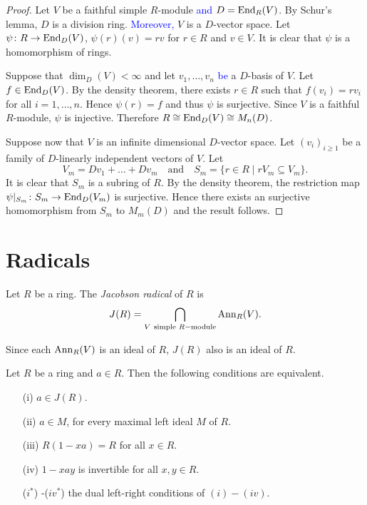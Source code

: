 \begin{proof}
Let $V$ be a faithful simple $R$-module \textcolor{blue}{and}
$D=\operatorname{End}_R(V)$. By Schur's lemma, $D$ is a division ring. 
\textcolor{blue}{Moreover,} 
$V$ is a $D$-vector space.
Let $\psi\colon R\rightarrow\operatorname{End}_D(V)$, $\psi
(r)(v)=rv$ for $r\in R$ and $v\in V$. It is clear that $\psi$ is a homomorphism of rings.

Suppose that $\dim_D(V)<\infty$ and let $v_1,\dots,v_n$ \textcolor{blue}{be} 
a $D$-basis of $V$. Let $f\in \operatorname{End}_D(V)$. By the density theorem, 
there exists $r\in R$ such that $f(v_i)=rv_i$ for all
$i=1,\dots,n$. Hence $\psi (r)=f$ and thus $\psi$ is surjective. Since
$V$ is a faithful $R$-module, $\psi$ is injective. Therefore $R\cong \operatorname{End}_D(V)\cong M_n(D)$. 

Suppose now that $V$ is an infinite dimensional $D$-vector space. Let $(
v_i) _{i\geq 1}$ be a family of $D$-linearly independent vectors of $V$. Let
$$V_m=Dv_1+\dots+Dv_m\quad\mbox{and}\quad S_m=\{ r\in R\mid rV_m\subseteq
V_m\} .$$
It is clear that $S_m$ is a subring of $R$. By the density theorem,
the restriction map 
$\psi |_{S_m}\colon S_m\rightarrow \operatorname{End}_D(V_m)$ is surjective. 
Hence there exists an surjective homomorphism from $S_m$ to $M_m(D)$ and the result follows.
\end{proof}

\section{Radicals}

\begin{definition}
Let $R$ be a ring. The \emph{Jacobson radical} of $R$ is
\[
J(R)=\bigcap_{V \mbox{ \scriptsize{simple} }R-\mbox{\scriptsize{module}}} \operatorname{Ann}_R(V).
\]
\end{definition}

Since each $\operatorname{Ann}_R(V)$ is an ideal of $R$, $J(R)$ also is an ideal of $R$.

\begin{theorem}[Jacobson]\label{Teorema 1.3.1}
Let $R$ be a ring and $a\in R$. Then the following conditions are equivalent.
\begin{itemize}\item[(i)] $a\in J(R)$.
\item[(ii)] $a\in  M$, for every maximal left ideal $M$ of $R$.
\item[(iii)] $R(1-xa)=R$ for all $x\in R$.
\item[(iv)] $1-xay$ is invertible for all $x,y\in R$.
\item[($i^*$)]-($iv^*$) the dual left-right conditions of $(i)-(iv)$.
\end{itemize}
\end{theorem}


